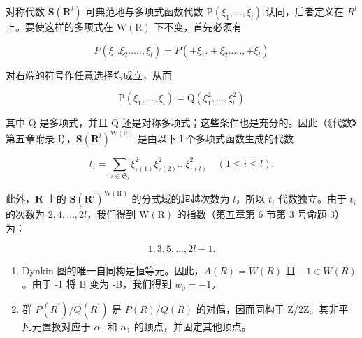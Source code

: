 对称代数 \(\mathbf{S}(\mathbf{R}^{l})\) 可典范地与多项式函数代数 \(\mathrm{P}(\xi_{1},\ldots,\xi_{l})\) 认同，后者定义在 \(R^{l}\) 上。要使这样的多项式在 \(\mathrm{W}(\mathrm{R})\) 下不变，首先必须有

\[
P \left(\xi_ {1}. \xi_ {2}. \dots ., \xi_ {l}\right) = P \left(\pm \xi_ {1}. \pm \xi_ {2}. \dots ., \pm \xi_ {l}\right)
\]

对右端的符号作任意选择均成立，从而

\[
\mathrm{P} \left(\xi_ {1}, \dots , \xi_ {l}\right) = \mathrm{Q} \left(\xi_ {1} ^ {2}, \dots , \xi_ {l} ^ {2}\right)
\]

其中 Q 是多项式，并且 Q 还是对称多项式；这些条件也是充分的。因此（《代数》第五章附录 I），\(\mathbf{S}(\mathbf{R}^{l})^{\mathrm{W}(\mathbb{R})}\) 是由以下 l 个多项式函数生成的代数

\[
t _ {i} = \sum_ {\tau \in \mathfrak {S} _ {l}} \xi_ {\tau (1)} ^ {2} \xi_ {\tau (2)} ^ {2} \dots \xi_ {\tau (l)} ^ {2} \quad (1 \leqslant i \leqslant l).
\]

此外，\(\mathbf{R}\) 上的 \(\mathbf{S}(\mathbf{R}^l)^{\mathrm{W(R)}}\) 的分式域的超越次数为 \(l\)，所以 \(t_i\) 代数独立。由于 \(t_i\) 的次数为 \(2,4,\ldots ,2l\)，我们得到 \(\mathrm{W(R)}\) 的指数（第五章第 6 节第 3 号命题 3）为：

\[
1, 3, 5, \dots , 2 l - 1.
\]

\begin{enumerate}
\def\labelenumi{(\Roman{enumi})}
\setcounter{enumi}{10}
\item
  Dynkin 图的唯一自同构是恒等元。因此，\(A(R) = W(R)\) 且 \(-1 \in W(R)\)。由于 -1 将 B 变为 -B，我们得到 \(w_{0} = -1\)。
\item
  群 \(P(R^{\prime})/Q(R^{\prime})\) 是 \(P(R)/Q(R)\) 的对偶，因而同构于 Z/2Z。其非平凡元置换对应于 \(\alpha_{0}\) 和 \(\alpha_{1}\) 的顶点，并固定其他顶点。
\end{enumerate}

